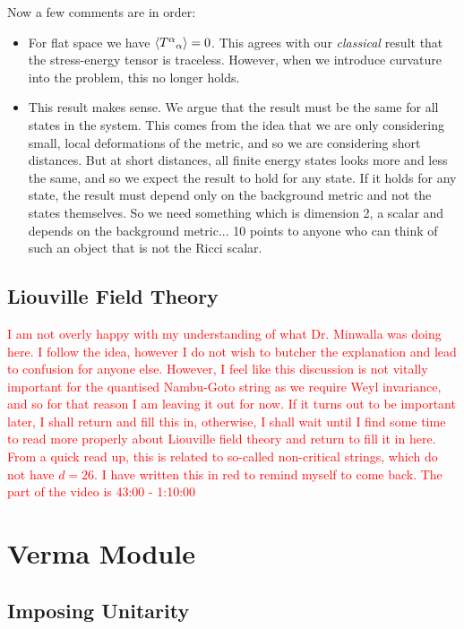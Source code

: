 Now a few comments are in order:
\begin{itemize}
    \item For flat space we have $\langle {T^{\alpha}}_{\alpha}\rangle = 0$. This agrees with our \textit{classical} result that the stress-energy tensor is traceless. However, when we introduce curvature into the problem, this no longer holds. 
    \item This result makes sense. We argue that the result must be the same for all states in the system. This comes from the idea that we are only considering small, local deformations of the metric, and so we are considering short distances. But at short distances, all finite energy states looks more and less the same, and so we expect the result to hold for any state. If it holds for any state, the result must depend only on the background metric and not the states themselves. So we need something which is dimension 2, a scalar and depends on the background metric... 10 points to anyone who can think of such an object that is not the Ricci scalar. 
\end{itemize}

\subsection{Liouville Field Theory}

\textcolor{red}{I am not overly happy with my understanding of what Dr. Minwalla was doing here. I follow the idea, however I do not wish to butcher the explanation and lead to confusion for anyone else. However, I feel like this discussion is not vitally important for the quantised Nambu-Goto string as we require Weyl invariance, and so for that reason I am leaving it out for now. If it turns out to be important later, I shall return and fill this in, otherwise, I shall wait until I find some time to read more properly about Liouville field theory and return to fill it in here. From a quick read up, this is related to so-called non-critical strings, which do not have $d=26$. I have written this in red to remind myself to come back. The part of the video is 43:00 - 1:10:00}

\section{Verma Module}

\subsection{Imposing Unitarity}


